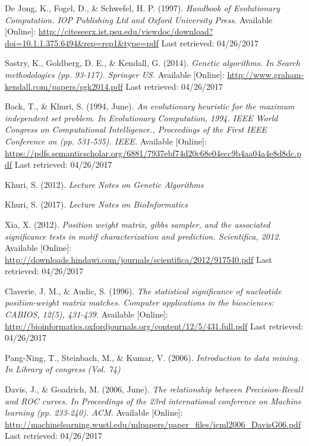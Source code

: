 \documentclass[12pt,a4paper]{article}
\begin{document}
\begin{thebibliography}{9}
		De Jong, K., Fogel, D., \& Schwefel, H. P. (1997). 
		\textit{Handbook of Evolutionary Computation. IOP Publishing Ltd and Oxford University Press.}
		Available [Online]: \url{http://citeseerx.ist.psu.edu/viewdoc/download?doi=10.1.1.375.6494&rep=rep1&type=pdf}
		Last retrieved: 04/26/2017

		Sastry, K., Goldberg, D. E., \& Kendall, G. (2014).
		\textit{ Genetic algorithms. In Search methodologies (pp. 93-117). Springer US.}
		Available [Online]: \url{http://www.graham-kendall.com/papers/sgk2014.pdf}
		Last retrieved: 04/26/2017
		
		Back, T., \& Khuri, S. (1994, June). 
		\textit{ An evolutionary heuristic for the maximum independent set problem. In Evolutionary Computation, 1994. IEEE World Congress on Computational Intelligence., Proceedings of the First IEEE Conference on (pp. 531-535). IEEE.}
		Available [Online]: \url{https://pdfs.semanticscholar.org/6881/7937ebf74d20c68e04ecc9b4aa04a4e8d8dc.pdf}
		Last retrieved: 04/26/2017

		Khuri, S. (2012). 
		\textit{ Lecture Notes on Genetic Algorithms }

		Khuri, S. (2017). 
		\textit{ Lecture Notes on BioInformatics }	    

		Xia, X. (2012).
		\textit{ Position weight matrix, gibbs sampler, and the associated significance tests in motif characterization and prediction. Scientifica, 2012.}
		Available [Online]: \url{http://downloads.hindawi.com/journals/scientifica/2012/917540.pdf} Last retrieved: 04/26/2017
		
		Claverie, J. M., \& Audic, S. (1996).
		\textit{The statistical significance of nucleotide position-weight matrix matches. Computer applications in the biosciences: CABIOS, 12(5), 431-439.}
		Available [Online]: \url{http://bioinformatics.oxfordjournals.org/content/12/5/431.full.pdf} Last retrieved: 04/26/2017
	    
		Pang-Ning, T., Steinbach, M., \& Kumar, V. (2006).  
		\textit{Introduction to data mining. In Library of congress (Vol. 74) }

		Davis, J., \& Goadrich, M. (2006, June). 
		\textit{The relationship between Precision-Recall and ROC curves. In Proceedings of the 23rd international conference on Machine learning (pp. 233-240). ACM.}
		Available [Online]: \url{http://machinelearning.wustl.edu/mlpapers/paper_files/icml2006_DavisG06.pdf} Last retrieved: 04/26/2017


\end{thebibliography}
\end{document}
